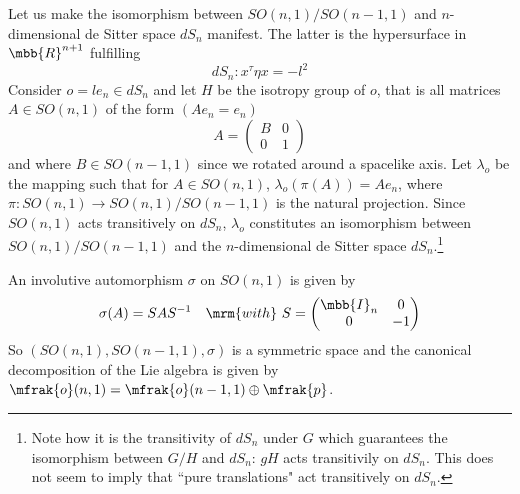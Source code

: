 \documentclass[11pt]{article}
\begin{document}
Let us make the isomorphism between $SO(n,1)/SO(n-1,1)$ and 
$n$-dimensional de Sitter space $dS_n$ manifest. The latter is 
the hypersurface in $\mbb{R}^{n+1}$ fulfilling
%
\begin{equation}
	dS_n : x^\tau \eta x = -l^2
\end{equation}
Consider $o = le_n \in dS_n$ and let $H$ be the isotropy group of 
$o$, that is all matrices $A \in SO(n,1)$ of the form $(Ae_n = 
e_n)$
%
\begin{displaymath}
	A =
	\begin{pmatrix}
		B & 0 \\
		0 & 1
	\end{pmatrix}
\end{displaymath}
and where $B \in SO(n-1,1)$ since we rotated around a spacelike 
axis. Let $\lambda_o$ be the mapping such that for $A \in 
SO(n,1)$, $\lambda_o(\pi(A)) = Ae_n$, where $\pi : SO(n,1) \to 
SO(n,1)/SO(n-1,1)$ is the natural projection. Since $SO(n,1)$ 
acts transitively on $dS_n$, $\lambda_o$ constitutes an 
isomorphism between $SO(n,1)/SO(n-1,1)$ and the $n$-dimensional 
de Sitter space $dS_n$.\footnote{Note how it is the transitivity 
	of $dS_n$ under $G$ which guarantees the isomorphism between 
	$G/H$ and $dS_n$: $gH$ acts transitivily on $dS_n$. This does 
	not seem to imply that ``pure translations" act transitively on 
	$dS_n$.}

An involutive automorphism $\sigma$ on $SO(n,1)$ is given by
\begin{displaymath}
	\sigma(A) = SAS^{-1}\quad\mrm{with}~
	S =
	\begin{pmatrix}
		\mbb{I}_n & 0 \\
		0 & -1
	\end{pmatrix}
\end{displaymath}
So $(SO(n,1),SO(n-1,1),\sigma)$ is a symmetric space and the 
canonical decomposition of the Lie algebra is given by 
$\mfrak{o}(n,1) = \mfrak{o}(n-1,1) \oplus \mfrak{p}$.
\end{document}
